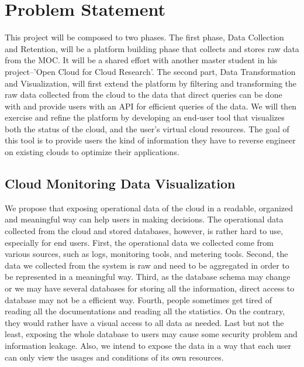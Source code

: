 \section{Problem Statement}
\label{sec:ProblemStatement}

This project will be composed to two phases. The first phase, Data Collection and Retention, will be a platform building phase that collects and stores raw data from the MOC. It will be a shared effort with another master student in his project--'Open Cloud for Cloud Research'.  
The second part, Data Transformation and Visualization, will first extend the platform by filtering and transforming the raw data collected from the cloud to the data that direct queries can be done with and provide users with an API for efficient queries of the data. We will then exercise and refine the platform by developing an end-user tool that visualizes both the status of the cloud, and the user’s virtual cloud resources. The goal of this tool is to provide users the kind of information they have to reverse engineer on existing clouds to optimize their applications.



\subsection{Cloud Monitoring Data Visualization}
  We propose that exposing operational data of the cloud in a readable, organized and meaningful way can help users in making decisions. The operational data collected from the cloud and stored databases, however, is rather hard to use, especially for end users. First, the operational data we collected come from various sources, such as logs, monitoring tools, and metering tools. Second, the data we collected from the system is raw and need to be aggregated in order to be represented in a meaningful way. Third, as the database schema may change or we may have several databases for storing all the information, direct access to database may not be a efficient way. Fourth, people sometimes get tired of reading all the documentations and reading all the statistics. On the contrary, they would rather have a visual access to all data as needed. Last but not the least, exposing the whole database to users may cause some security problem and information leakage. Also, we intend to expose the data in a way that each user can only view the usages and conditions of its own resources.  

